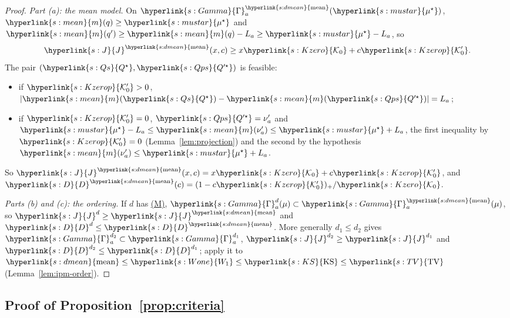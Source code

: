 \documentclass[11pt]{article}
\newcommand{\sy}[2]{{\hyperlink{#1}{#2}}}
\newcommand{\term}[2]{\hyperlink{#1}{#2}}
\newcommand{\mean}{\sy{s:mean}{m}}
\newcommand{\TV}{\sy{s:TV}{\mathrm{TV}}}
\newcommand{\KSd}{\sy{s:KS}{\mathrm{KS}}}
\newcommand{\Wone}{\sy{s:Wone}{W_{1}}}
\newcommand{\dmean}{\sy{s:dmean}{\mathrm{mean}}}
\newcommand{\propM}{\term{s:M}{(M)}}
\newcommand{\mus}{\sy{s:mustar}{\mu^{\star}}}
\newcommand{\Pairs}{\sy{s:Gamma}{\Gamma}}
\newcommand{\Jf}{\sy{s:J}{J}}
\newcommand{\Dc}{\sy{s:D}{D}}
\newcommand{\Ko}{\sy{s:Kzero}{\mathcal{K}_{0}}}
\newcommand{\Kop}{\sy{s:Kzerop}{\mathcal{K}'_{0}}}
\newcommand{\Qs}{\sy{s:Qs}{Q^{\star}}}
\newcommand{\Qps}{\sy{s:Qps}{Q'^{\star}}}
\begin{document}
\begin{proof}
\emph{Part (a): the mean model.} On $\Pairs^{\dmean}_a(\mus)$, $\mean(q)\ge\mus$ and
$\mean(q')\ge \mean(q)-L_a\ge\mus-L_a$, so
\begin{equation*}
\Jf^{\dmean}(x,c)\ge x\Ko+c\Kop .
\end{equation*}
The pair $(\Qs,\Qps)$ is feasible:
\begin{itemize}
\item if $\Kop>0$, $|\mean(\Qs)-\mean(\Qps)|=L_a$;
\item if $\Kop=0$, $\Qps=\nu'_a$ and $\mus-L_a\le \mean(\nu'_a)\le\mus+L_a$, the first
  inequality by $\Kop=0$ (Lemma~\ref{lem:projection}) and the second by the hypothesis
  $\mean(\nu'_a)\le\mus+L_a$.
\end{itemize}
So $\Jf^{\dmean}(x,c)=x\Ko+c\Kop$, and $\Dc^{\dmean}(c)=(1-c\Kop)_+/\Ko$.

\emph{Parts (b) and (c): the ordering.} If $d$ has \propM{}, $\Pairs^d_a(\mu)\subset\Pairs^{\dmean}_a(\mu)$,
so $\Jf^d\ge \Jf^{\dmean}$ and $\Dc^d\le \Dc^{\dmean}$. More generally $d_1\le d_2$ gives
$\Pairs^{d_2}_a\subset\Pairs^{d_1}_a$, $\Jf^{d_2}\ge \Jf^{d_1}$ and $\Dc^{d_2}\le \Dc^{d_1}$; apply it to
$\dmean\le \Wone\le\KSd\le\TV$ (Lemma~\ref{lem:ipm-order}).
\end{proof}

\subsection{Proof of Proposition~\ref{prop:criteria}}\label{sec:proof-prop-criteria}
\end{document}
